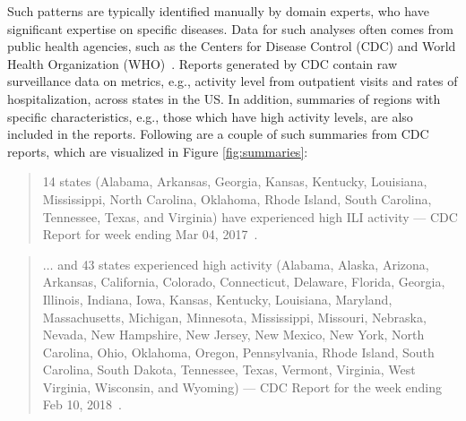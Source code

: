 Such patterns are typically identified manually by domain experts,
who have significant expertise on specific diseases.
Data for such analyses often comes from public health agencies,
such as the Centers for Disease Control (CDC) and
World Health Organization (WHO)~\cite{cdc:surveillance-report-feb10}.
Reports generated by CDC contain raw surveillance data on metrics, e.g.,
activity level from outpatient visits and rates of hospitalization,
across states in the US.
In addition, summaries of regions with specific characteristics,
e.g., those which have high activity levels, are also included in the reports.
Following are a couple of such summaries from CDC reports, which are visualized in Figure \ref{fig:summaries}:
\begin{quote}
14 states (Alabama, Arkansas, Georgia, Kansas, Kentucky, Louisiana, Mississippi, North Carolina, Oklahoma, Rhode Island, South Carolina, Tennessee, Texas, and Virginia) have experienced high ILI activity
--- CDC Report for week ending Mar 04, 2017~\cite{cdc:surveillance-report-mar04}.
\end{quote}
\begin{quote}
$\ldots$ and 43 states experienced high activity
(Alabama, Alaska, Arizona, Arkansas, California, Colorado, Connecticut, Delaware, Florida, Georgia, Illinois, Indiana, Iowa, Kansas, Kentucky, Louisiana, Maryland, Massachusetts, Michigan, Minnesota, Mississippi, Missouri, Nebraska, Nevada, New Hampshire, New Jersey, New Mexico, New York, North Carolina, Ohio, Oklahoma, Oregon, Pennsylvania, Rhode Island, South Carolina, South Dakota, Tennessee, Texas, Vermont, Virginia, West Virginia, Wisconsin, and Wyoming)
--- CDC Report for the week ending Feb 10, 2018~\cite{cdc:surveillance-report-feb10}.
\end{quote}


